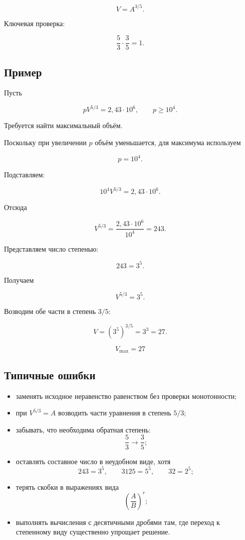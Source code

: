 \documentclass[a4paper,12pt]{article}
\newcommand{\subsect}[1]{%
  \subsection*{\color{accent}#1}%
}
\begin{document}
\[
\boxed{
V=A^{3/5}
}.
\]

Ключевая проверка:

\[
\frac53\cdot\frac35=1.
\]


\subsect{Пример}

Пусть

\[
pV^{5/3}
=
2{,}43\cdot10^6,
\qquad
p\ge10^4.
\]

Требуется найти максимальный объём.

Поскольку при увеличении $p$ объём уменьшается,
для максимума используем

\[
p=10^4.
\]

Подставляем:

\[
10^4V^{5/3}
=
2{,}43\cdot10^6.
\]

Отсюда

\[
V^{5/3}
=
\frac{2{,}43\cdot10^6}{10^4}
=
243.
\]

Представляем число степенью:

\[
243=3^5.
\]

Получаем

\[
V^{5/3}=3^5.
\]

Возводим обе части в степень $3/5$:

\[
V
=
(3^5)^{3/5}
=
3^3
=
27.
\]

\[
\boxed{V_{\max}=27}
\]


\subsect{Типичные ошибки}

\begin{itemize}

  \item заменять исходное неравенство равенством без проверки монотонности;

  \item при $V^{5/3}=A$ возводить части уравнения в степень $5/3$;

  \item забывать, что необходима обратная степень:
  \[
  \frac53\longrightarrow\frac35;
  \]

  \item оставлять составное число в неудобном виде, хотя
  \[
  243=3^5,
  \qquad
  3125=5^5,
  \qquad
  32=2^5;
  \]

  \item терять скобки в выражениях вида
  \[
  \left(\frac AB\right)^r;
  \]

  \item выполнять вычисления с десятичными дробями там,
  где переход к степенному виду существенно упрощает решение.

\end{itemize}
\end{document}
